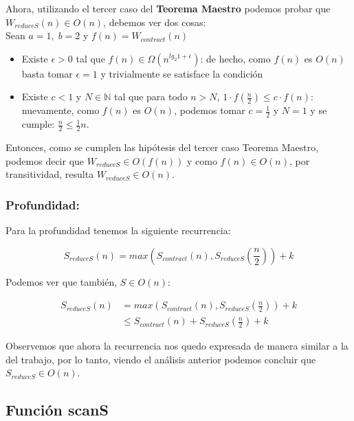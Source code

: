 \documentclass[11pt]{article}
\begin{document}
Ahora, utilizando el tercer caso del \textbf{Teorema Maestro} podemos probar que
$W_{reduceS}(n) \in O(n)$, debemos ver dos cosas: \\

Sean $a = 1, \; b = 2$ y $f(n) = W_{contract}(n)$

\begin{itemize}
    \item Existe $\epsilon > 0$ tal que $f(n) \in \Omega(n^{lg_2 1 + \epsilon})$:
          de hecho, como $f(n)$ es $O(n)$ basta tomar $\epsilon = 1$
          y trivialmente se satisface la condición
    \item  Existe $c < 1$ y $N \in \mathbb{N}$ tal que para todo $n > N$,
           $1 \cdot f(\frac{n}{2}) \leq c \cdot f(n)$: nuevamente, como $f(n)$ es $O(n)$, 
           podemos tomar $c = \frac{1}{2}$ y $N = 1$ y se cumple: $\frac{n}{2} \leq \frac{1}{2}n$. 
\end{itemize}

Entonces, como se cumplen las hipótesis del tercer caso Teorema Maestro,
podemos decir que $W_{reduceS} \in O(f(n))$ y como $f(n) \in O(n)$, por transitividad,
resulta $W_{reduceS} \in O(n)$. \\

\subsubsection{Profundidad:}

Para la profundidad tenemos la siguiente recurrencia:

\begin{equation*}
    S_{reduceS}(n) = max(S_{contract}(n), S_{reduceS}(\frac{n}{2})) + k
\end{equation*}

Podemos ver que también, $S \in O(n)$:

\begin{align*}
    S_{reduceS}(n) & = max(S_{contract}(n), S_{reduceS}(\frac{n}{2})) + k \\
                   & \leq S_{contract}(n) + S_{reduceS}(\frac{n}{2}) + k
\end{align*}

Observemos que ahora la recurrencia nos quedo expresada de manera similar
a la del trabajo, por lo tanto, viendo el análisis anterior podemos 
concluir que $S_{reduceS} \in O(n)$.


\subsection{Función scanS}
\end{document}
